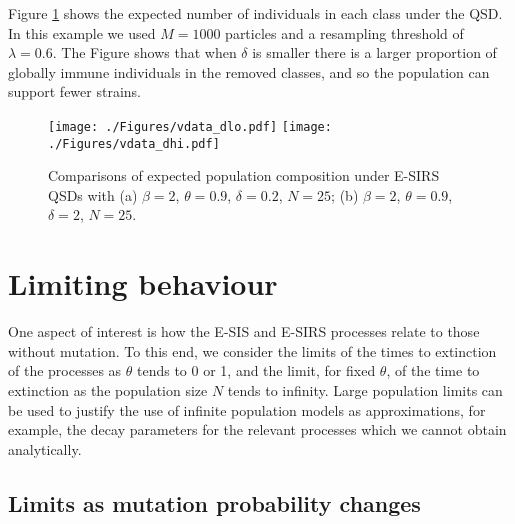 \documentclass[review]{elsarticle}
\begin{document}
Figure \ref{fig: example sirs} shows the expected number of individuals in each class under the QSD. In this example we used $M=1000$ particles and a resampling threshold of $\lambda=0.6$. The Figure shows that when $\delta$ is smaller there is a larger proportion of globally immune individuals in the removed classes, and so the population can support fewer strains.

\begin{figure}[t!]
	\centering
 		\texttt{[image: ./Figures/vdata\_dlo.pdf]}
 		\texttt{[image: ./Figures/vdata\_dhi.pdf]}
	\caption{Comparisons of expected population composition under E-SIRS QSDs with (a) $\beta = 2$, $\theta = 0.9$, $\delta=0.2$, $N = 25$; (b) $\beta=2$, $\theta = 0.9$, $\delta=2$, $N=25$.}
	\label{fig: example sirs}
\end{figure}

\section{Limiting behaviour}\label{sec: limit}
One aspect of interest is how the E-SIS and E-SIRS processes relate to those without mutation. To this end, we consider the limits of the times to extinction of the processes as $\theta$ tends to 0 or 1, and the limit, for fixed $\theta$, of the time to extinction as the population size $N$ tends to infinity. Large population limits can be used to justify the use of infinite population models as approximations, for example, the decay parameters for the relevant processes which we cannot obtain analytically. 

\subsection{Limits as mutation probability changes}\label{subsec: theta limit}
\end{document}
